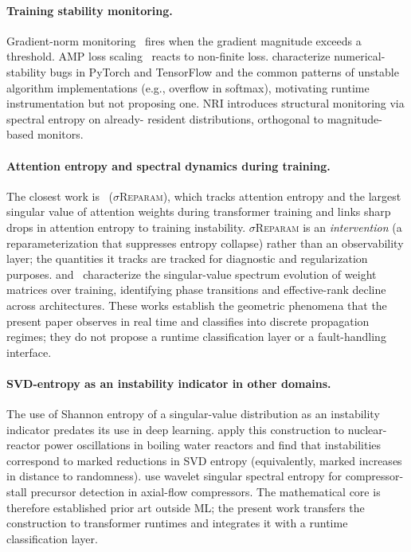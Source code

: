 \documentclass[11pt,a4paper]{article}
\theoremstyle{plain}
\begin{document}
\paragraph{Training stability monitoring.}
Gradient-norm monitoring~\citep{goodfellow2016deep} fires when the
gradient magnitude exceeds a threshold.
AMP loss scaling~\citep{micikevicius2018mixed} reacts to non-finite
loss.
\citet{kloberdanz2022deepstability} characterize numerical-stability
bugs in PyTorch and TensorFlow and the common patterns of unstable
algorithm implementations (e.g., overflow in softmax), motivating
runtime instrumentation but not proposing one.
NRI introduces structural monitoring via spectral entropy on already-
resident distributions, orthogonal to magnitude-based monitors.

\paragraph{Attention entropy and spectral dynamics during training.}
The closest work is~\citet{zhai2023sigma} (\textsc{$\sigma$Reparam}),
which tracks attention entropy and the largest singular value of
attention weights during transformer training and links sharp drops in
attention entropy to training instability. \textsc{$\sigma$Reparam} is
an \emph{intervention} (a reparameterization that suppresses entropy
collapse) rather than an observability layer; the quantities it tracks
are tracked for diagnostic and regularization purposes.
\citet{martin2021implicit} and~\citet{yunis2024spectral} characterize
the singular-value spectrum evolution of weight matrices over
training, identifying phase transitions and effective-rank decline
across architectures. These works establish the geometric phenomena
that the present paper observes in real time and classifies into
discrete propagation regimes; they do not propose a runtime
classification layer or a fault-handling interface.

\paragraph{SVD-entropy as an instability indicator in other domains.}
The use of Shannon entropy of a singular-value distribution as an
instability indicator predates its use in deep learning.
\citet{rodriguez2022bwr} apply this construction to nuclear-reactor
power oscillations in boiling water reactors and find that
instabilities correspond to marked reductions in SVD entropy
(equivalently, marked increases in distance to randomness).
\citet{zhang2022wse} use wavelet singular spectral entropy for
compressor-stall precursor detection in axial-flow compressors.
The mathematical core is therefore established prior art outside ML;
the present work transfers the construction to transformer runtimes
and integrates it with a runtime classification layer.
\end{document}

